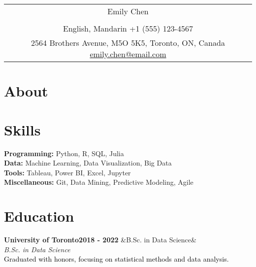 \documentclass[a4paper,8pt]{article}
\newcommand{\entry}[4]{
    \noindent\textbf{\color{headerColor}#1}\hfill\textbf{\color{subHeaderColor}#2}
    \ifx&#3&\else\\\noindent\textit{\color{subHeaderColor}#3}\fi
      \\#4
    \vspace{5pt} %
  }
\begin{document}
  \pagestyle{empty}
  
  \begin{tabularx}{\linewidth}{@{} C @{}}
  
  \color{headerColor} \Huge{Emily Chen} \\[6pt]\\
  \textcolor{subHeaderColor}{\raisebox{-0.05\height}{\faLanguage} English, Mandarin }
\textcolor{subHeaderColor}{\raisebox{-0.05\height}{\faMobile} +1 (555) 123-4567 }
\textcolor{subHeaderColor}{{\href{https://github.com/emilychen}{\raisebox{-0.05\height}{\faGithub}}} }
\\\textcolor{subHeaderColor}{\raisebox{-0.05\height}{\faMapMarker} 2564 Brothers Avenue, M5O 5K5, Toronto, ON, Canada          }
\textcolor{subHeaderColor}{{\href{mailto:emily.chen@email.com}{\raisebox{-0.05\height}{\faEnvelope} emily.chen@email.com}} }
\end{tabularx}
\color{headerColor}\section{About}\vspace{1ex}\color{black}{As a data analyst with a strong background in statistical modeling and data visualization, I am seeking opportunities to leverage my skills in data-driven decision making and insights generation.}\color{headerColor}\section{Skills}
\vspace{1ex}
  \color{headerColor}\textbf{Programming:} \color{black} Python, R, SQL, Julia
\\
  \color{headerColor}\textbf{Data:} \color{black} Machine Learning, Data Visualization, Big Data
\\
  \color{headerColor}\textbf{Tools:} \color{black} Tableau, Power BI, Excel, Jupyter
\\
  \color{headerColor}\textbf{Miscellaneous:} \color{black} Git, Data Mining, Predictive Modeling, Agile

  \color{headerColor}\section{Education}
\vspace{1ex}
  \entry{University of Toronto}
      {2018 - 2022}
      {B.Sc. in Data Science}
      {\textcolor{black}{Graduated with honors, focusing on statistical methods and data analysis.}}
\end{document}
